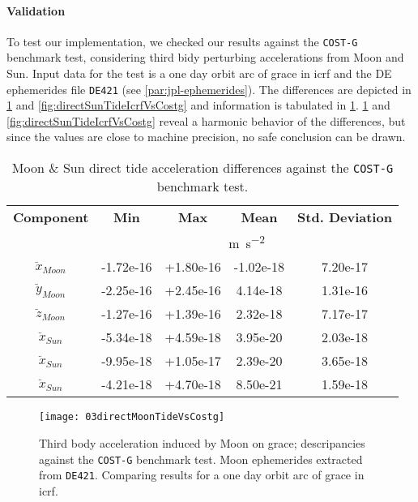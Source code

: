 \paragraph{Validation}\label{sssec:third-body-perurbation-validation}

To test our implementation, we checked our results against the \texttt{COST-G} 
benchmark test, considering third bidy perturbing accelerations from Moon and Sun. 
Input data for the test is a one day orbit arc of \gls{grace} in \gls{icrf} and 
the DE ephemerides file \texttt{DE421} (see \ref{par:jpl-ephemerides}). 
The differences are depicted in \ref{fig:directMoonTideIcrfVsCostg} and \ref{fig:directSunTideIcrfVsCostg} 
and information is tabulated in \ref{fig:directMoonTideIcrfVsCostg}.
\ref{fig:directMoonTideIcrfVsCostg} and \ref{fig:directSunTideIcrfVsCostg} reveal a 
harmonic behavior of the differences, but since the values are close to machine precision, 
no safe conclusion can be drawn.

\begin{table}[h!]
  \centering
  \begin{tabular}{ccccc}
      \textbf{Component} & \textbf{Min} & \textbf{Max} & \textbf{Mean} & \textbf{Std. Deviation}\\
      & \multicolumn{4}{c}{\si{\metre\per\square\second}} \\
      \hline
      $\ddot{x}_{Moon}$ & -1.72e-16 & +1.80e-16 & -1.02e-18 & 7.20e-17 \\ 
      $\ddot{y}_{Moon}$ & -2.25e-16 & +2.45e-16 & 4.14e-18  & 1.31e-16 \\
      $\ddot{z}_{Moon}$ & -1.27e-16 & +1.39e-16 & 2.32e-18  & 7.17e-17 \\
      $\ddot{x}_{Sun}$  & -5.34e-18 & +4.59e-18 & 3.95e-20  & 2.03e-18 \\
      $\ddot{x}_{Sun}$  & -9.95e-18 & +1.05e-17 & 2.39e-20  & 3.65e-18 \\
      $\ddot{x}_{Sun}$  & -4.21e-18 & +4.70e-18 & 8.50e-21  & 1.59e-18 \\
      \hline
  \end{tabular}
  \caption{Moon \& Sun direct tide acceleration differences against the \texttt{COST-G} benchmark test.}
  \label{table:directMoonTideIcrfVsCostg}
\end{table}

\begin{figure}
  \centering
  \texttt{[image: 03directMoonTideVsCostg]}
  \caption{Third body acceleration induced by Moon on \gls{grace}; descripancies 
   against the \texttt{COST-G} benchmark test. Moon ephemerides extracted from \texttt{DE421}.
   Comparing results for a one day orbit arc of \gls{grace} in \gls{icrf}.}
  \label{fig:directMoonTideIcrfVsCostg}
\end{figure}

